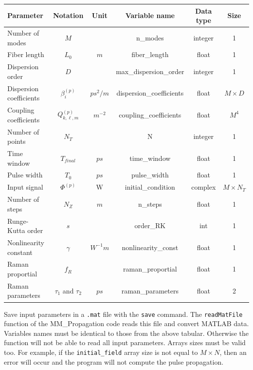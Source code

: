 \documentclass[11pt]{amsart}
\newcommand{\name}{{\rm MM\_Propagation }}
\begin{document}
\begin{tabular}{|l|c|c|c|c|c|}
  \hline
  \bf{Parameter} & \bf{Notation} & \bf{Unit} & \bf{Variable name} & \bf{Data type} & \bf{Size} \\
  \hline
  Number of modes & $M$ & & n\_modes & integer & 1 \\
  \hline
  Fiber length & $L_0$ & $m$ & fiber\_length & float & 1 \\
  \hline
  Dispersion order & $D$ & & max\_dispersion\_order & integer & 1 \\
  \hline
  Dispersion coefficients & $\beta_i^{(p)}$ & $ps^2/m$ & dispersion\_coefficients & float & $M \times D$ \\
  \hline
  Coupling coefficients & $Q_{k,\ell,m}^{(p)}$ & $m^{-2}$ & coupling\_coefficients & float & $M^4$ \\
  \hline
  Number of points & $N_T$ & & N & integer & 1 \\
  \hline
  Time window & $T_{final}$ & $ps$ & time\_window & float & 1 \\
  \hline
  Pulse width & $T_0$ & $ps$ & pulse\_width & float & 1 \\
  \hline
  Input signal & $\Phi^{(p)}$ & W & initial\_condition & complex & $M \times N_T$ \\
  \hline
  Number of steps & $N_Z$ & $m$ & n\_steps & float & 1 \\
  \hline
  Runge-Kutta order & $s$ & & order\_RK & int & 1 \\
  \hline
  Nonlinearity constant & $\gamma$ & $W^{-1} m$ & nonlinearity\_const & float & 1 \\
  \hline
  Raman proportial & $f_R$ & & raman\_proportial & float & 1 \\
  \hline
  Raman parameters & $\tau_1$ and $\tau_2$ & $ps$ & raman\_parameters & float & 2 \\
  \hline
\end{tabular}

Save input parameters in a {\tt .mat} file with the {\tt save} command.
The \texttt{readMatFile} function of the \name code reads this file and convert MATLAB data. \\

Variables names must be identical to those from the above tabular. Otherwise the function will not be able to read all input parameters.
Arrays sizes must be valid too. For example, if the \texttt{initial\_field} array size is not equal to $M \times N$, then an error will occur and the program will not compute the pulse propagation. \\
\end{document}
